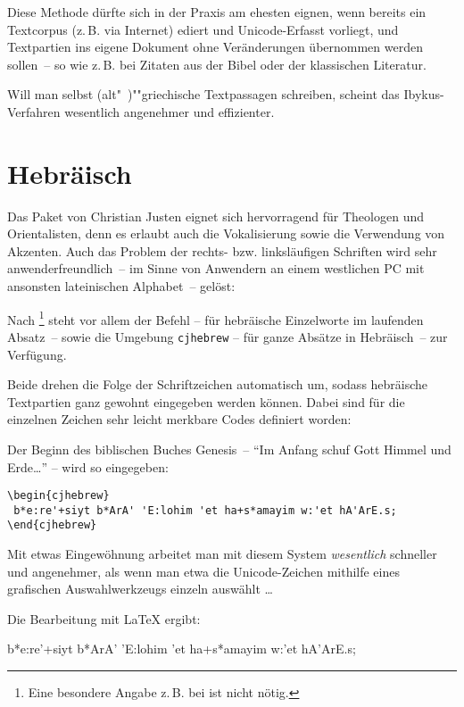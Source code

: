 Diese Methode dürfte sich in der Praxis am ehesten eignen, wenn bereits ein Textcorpus
(z.\,B. via Internet) ediert und Unicode-Erfasst vorliegt, und Textpartien ins eigene Dokument
ohne Veränderungen übernommen werden sollen~-- so wie z.\,B. bei Zitaten aus der Bibel oder
der klassischen Literatur.

Will man selbst (alt"~)""griechische Textpassagen schreiben, scheint das Ibykus-Verfahren
wesentlich angenehmer und effizienter.


\section{Hebräisch}

Das Paket  von Christian Justen eignet sich hervorragend für
Theologen und Orientalisten, denn es erlaubt auch die Vokalisierung sowie die Verwendung
von Akzenten. Auch das Problem der rechts- bzw. linksläufigen Schriften wird sehr
anwenderfreundlich~-- im Sinne von Anwendern an einem westlichen PC mit ansonsten
lateinischen Alphabet~-- gelöst:

Nach %
\footnote{Eine besondere Angabe z.\,B. bei  ist nicht nötig.}
steht vor allem der Befehl 
-- für hebräische Einzelworte im laufenden Absatz~-- sowie die
Umgebung \lstinline/cjhebrew/
-- für ganze Absätze in Hebräisch~-- zur Verfügung.

Beide drehen die Folge der Schriftzeichen automatisch um, sodass hebräische Textpartien
ganz gewohnt eingegeben werden können. Dabei sind für die einzelnen Zeichen sehr leicht
merkbare Codes definiert worden:

Der Beginn des biblischen Buches Genesis~-- \enquote{Im Anfang schuf Gott Himmel und Erde\dots} --
wird so eingegeben:

\begin{lstlisting}
\begin{cjhebrew}
 b*e:re'+siyt b*ArA' 'E:lohim 'et ha+s*amayim w:'et hA'ArE.s;
\end{cjhebrew}
\end{lstlisting}

Mit etwas Eingewöhnung arbeitet man mit diesem System \emph{wesentlich} schneller und
angenehmer, als wenn man etwa die Unicode-Zeichen mithilfe eines grafischen Auswahlwerkzeugs
einzeln auswählt \dots

Die Bearbeitung mit \LaTeX{} ergibt:

\begin{cjhebrew}
 b*e:re'+siyt b*ArA' 'E:lohim 'et ha+s*amayim w:'et hA'ArE.s;
\end{cjhebrew}

